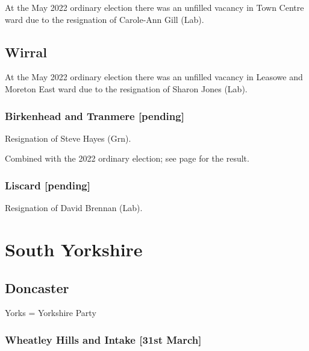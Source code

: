 \documentclass[a4paper,openany]{book}
\begin{document}
\begin{resultsiii}
At the May 2022 ordinary election there was an unfilled vacancy in Town Centre ward due to the resignation of Carole-Ann Gill (Lab).%

\subsection*{Wirral}

At the May 2022 ordinary election there was an unfilled vacancy in Leasowe and Moreton East ward due to the resignation of Sharon Jones (Lab).%

\subsubsection*{Birkenhead and Tranmere \hspace*{\fill}\nolinebreak[1]%
	\enspace\hspace*{\fill}
	[pending]}


Resignation of Steve Hayes (Grn).

Combined with the 2022 ordinary election; see page \pageref{WirralBirkenheadTranmere} for the result.

\subsubsection*{Liscard \hspace*{\fill}\nolinebreak[1]%
	\enspace\hspace*{\fill}
	[pending]}


Resignation of David Brennan (Lab).

\section{South Yorkshire}

\subsection*{Doncaster}

Yorks = Yorkshire Party

\subsubsection*{Wheatley Hills and Intake \hspace*{\fill}\nolinebreak[1]%
	\enspace\hspace*{\fill}
	[31st March]}


\end{resultsiii}
\end{document}
